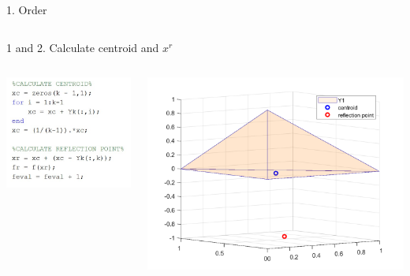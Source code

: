 \documentclass{beamer}
\begin{document}
\begin{frame}{1. Order}
\begin{columns}
\begin{column}{0.59\linewidth}
	\end{column}
	\end{columns}
\end{frame}

\begin{frame}{1 and 2. Calculate centroid and $x^r$}
	\begin{columns}
	\begin{column}{0.35\linewidth}
		\centering
		\includegraphics[width=0.95\linewidth]{Order2}
	\end{column}
	\begin{column}{0.59\linewidth}
		\centering
		\includegraphics[width=0.95\linewidth]{Order2Fig}
	\end{column}
	\end{columns}
\end{frame}
\end{document}
